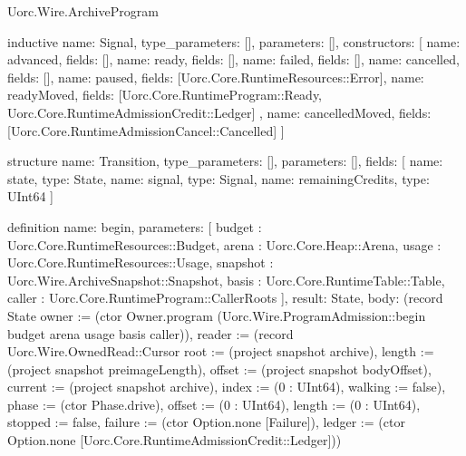 \begin{lexlean}{Uorc.Wire.ArchiveProgram}
\begin{semanticmodule}
inductive{
  name: Signal,
  type_parameters: [],
  parameters: [],
  constructors: [
    {name: advanced, fields: []},
    {name: ready, fields: []},
    {name: failed, fields: []},
    {name: cancelled, fields: []},
    {name: paused, fields: [Uorc.Core.RuntimeResources::Error]},
    {
      name: readyMoved,
      fields: [Uorc.Core.RuntimeProgram::Ready, Uorc.Core.RuntimeAdmissionCredit::Ledger]
    },
    {name: cancelledMoved, fields: [Uorc.Core.RuntimeAdmissionCancel::Cancelled]}
  ]
}

structure{
  name: Transition,
  type_parameters: [],
  parameters: [],
  fields: [
    {name: state, type: State},
    {name: signal, type: Signal},
    {name: remainingCredits, type: UInt64}
  ]
}

definition{
  name: begin,
  parameters: [
    budget : Uorc.Core.RuntimeResources::Budget,
    arena : Uorc.Core.Heap::Arena,
    usage : Uorc.Core.RuntimeResources::Usage,
    snapshot : Uorc.Wire.ArchiveSnapshot::Snapshot,
    basis : Uorc.Core.RuntimeTable::Table,
    caller : Uorc.Core.RuntimeProgram::CallerRoots
  ],
  result: State,
  body: (record State {owner := (ctor Owner.program (Uorc.Wire.ProgramAdmission::begin budget arena usage basis caller)), reader := (record Uorc.Wire.OwnedRead::Cursor {root := (project snapshot archive), length := (project snapshot preimageLength), offset := (project snapshot bodyOffset), current := (project snapshot archive), index := (0 : UInt64), walking := false}), phase := (ctor Phase.drive), offset := (0 : UInt64), length := (0 : UInt64), stopped := false, failure := (ctor Option.none [Failure]), ledger := (ctor Option.none [Uorc.Core.RuntimeAdmissionCredit::Ledger])})
}


\end{semanticmodule}
\end{lexlean}
